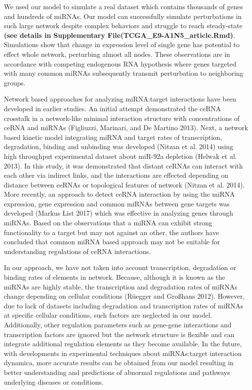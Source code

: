 \documentclass[]{article}
\begin{document}
\href{}{} We used our model to simulate a real dataset which contains
thousands of genes and hundreds of miRNAs. Our model can successfully
simulate perturbations in such large network despite complex behaviors
and struggle to reach steady-state \textbf{(see details in Supplementary
File(TCGA\_E9-A1N5\_article.Rmd)}. Simulations show that change in
expression level of single gene has potential to effect whole network,
perturbing almost all nodes. These observations are in accordance with
competing endogenous RNA hypothesis where genes targeted with many
common miRNAs subsequently transmit perturbation to neighboring groups.

Network based approaches for analyzing miRNA:target interactions have
been developed in earlier studies. An initial attempt demonstrated the
ceRNA crosstalk in a network-like minimal interaction structure with
concentrations of ceRNA and miRNAs (Figliuzzi, Marinari, and De Martino
2013). Next, a network based kinetic model integrating miRNA and target
rates of transcription, degradation, binding and unbinding was developed
(Nitzan et al. 2014) using high throughput experimental dataset about
miR-92a depletion (Helwak et al. 2013). In this study, it was
demonstrated that distant ceRNAs can interact with each other via
indirect links, and the interactions are effected depending on distance
between ceRNAs or topological features of network (Nitzan et al. 2014).
More recently, an approach to detect ceRNA interaction by using the
miRNA expression, gene expression and common miRNAs between gene targets
was developed (Markus List 2017) which was effective in analyzing genes
through miRNAs. Based on the observations that a miRNA can exhibit
strong functionality to a target but may not against an other, the
authors have concluded that common miRNA based approach may not be
suitable for understanding regulations of ceRNA interactions.

In our approach, we have not taken into account transcription,
degradation or binding rates of elements in network. Because, although
it is known as the miRNAs are highly stable, the transcription and
degradation rates of miRNAs change depending on cellular conditions
(Rüegger and Großhans 2012). However, due to lack of datasets including
degradation and transcription rates of miRNAs at specific cellular
conditions, such factors are neglected in our model. Additionally, other
regulation parameters such as gene-gene interactions and transcription
factors are ignored but the network structure is flexible and can
integrate additional regulation elements as they become available. In
the future, with developments in experimental techniques about
miRNAs:target interaction dynamica, more accurate results can be
obtained from our model resulting in better understanding and
predictions of abnormal regulations and pathways underlying diseases or
conditions.
\end{document}
